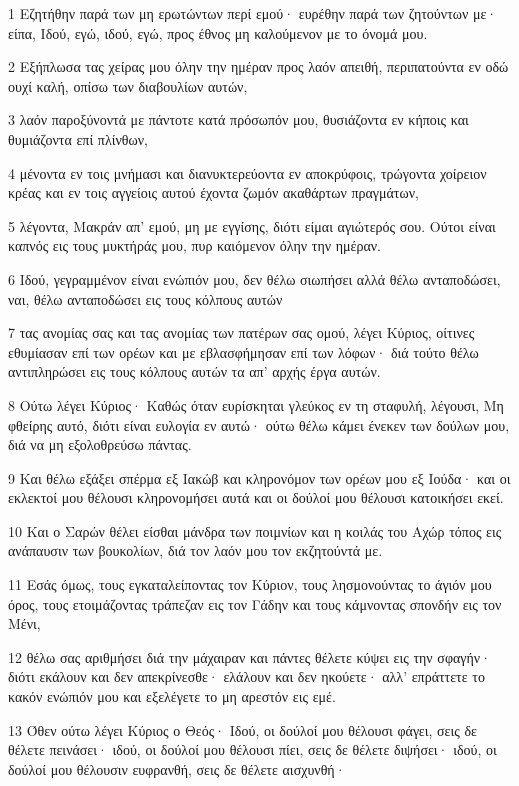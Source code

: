 \par 1 Εζητήθην παρά των μη ερωτώντων περί εμού· ευρέθην παρά των ζητούντων με· είπα, Ιδού, εγώ, ιδού, εγώ, προς έθνος μη καλούμενον με το όνομά μου.
\par 2 Εξήπλωσα τας χείρας μου όλην την ημέραν προς λαόν απειθή, περιπατούντα εν οδώ ουχί καλή, οπίσω των διαβουλίων αυτών,
\par 3 λαόν παροξύνοντά με πάντοτε κατά πρόσωπόν μου, θυσιάζοντα εν κήποις και θυμιάζοντα επί πλίνθων,
\par 4 μένοντα εν τοις μνήμασι και διανυκτερεύοντα εν αποκρύφοις, τρώγοντα χοίρειον κρέας και εν τοις αγγείοις αυτού έχοντα ζωμόν ακαθάρτων πραγμάτων,
\par 5 λέγοντα, Μακράν απ' εμού, μη με εγγίσης, διότι είμαι αγιώτερός σου. Ούτοι είναι καπνός εις τους μυκτήράς μου, πυρ καιόμενον όλην την ημέραν.
\par 6 Ιδού, γεγραμμένον είναι ενώπιόν μου, δεν θέλω σιωπήσει αλλά θέλω ανταποδώσει, ναι, θέλω ανταποδώσει εις τους κόλπους αυτών
\par 7 τας ανομίας σας και τας ανομίας των πατέρων σας ομού, λέγει Κύριος, οίτινες εθυμίασαν επί των ορέων και με εβλασφήμησαν επί των λόφων· διά τούτο θέλω αντιπληρώσει εις τους κόλπους αυτών τα απ' αρχής έργα αυτών.
\par 8 Ούτω λέγει Κύριος· Καθώς όταν ευρίσκηται γλεύκος εν τη σταφυλή, λέγουσι, Μη φθείρης αυτό, διότι είναι ευλογία εν αυτώ· ούτω θέλω κάμει ένεκεν των δούλων μου, διά να μη εξολοθρεύσω πάντας.
\par 9 Και θέλω εξάξει σπέρμα εξ Ιακώβ και κληρονόμον των ορέων μου εξ Ιούδα· και οι εκλεκτοί μου θέλουσι κληρονομήσει αυτά και οι δούλοί μου θέλουσι κατοικήσει εκεί.
\par 10 Και ο Σαρών θέλει είσθαι μάνδρα των ποιμνίων και η κοιλάς του Αχώρ τόπος εις ανάπαυσιν των βουκολίων, διά τον λαόν μου τον εκζητούντά με.
\par 11 Εσάς όμως, τους εγκαταλείποντας τον Κύριον, τους λησμονούντας το άγιόν μου όρος, τους ετοιμάζοντας τράπεζαν εις τον Γάδην και τους κάμνοντας σπονδήν εις τον Μένι,
\par 12 θέλω σας αριθμήσει διά την μάχαιραν και πάντες θέλετε κύψει εις την σφαγήν· διότι εκάλουν και δεν απεκρίνεσθε· ελάλουν και δεν ηκούετε· αλλ' επράττετε το κακόν ενώπιόν μου και εξελέγετε το μη αρεστόν εις εμέ.
\par 13 Όθεν ούτω λέγει Κύριος ο Θεός· Ιδού, οι δούλοί μου θέλουσι φάγει, σεις δε θέλετε πεινάσει· ιδού, οι δούλοί μου θέλουσι πίει, σεις δε θέλετε διψήσει· ιδού, οι δούλοί μου θέλουσιν ευφρανθή, σεις δε θέλετε αισχυνθή·
